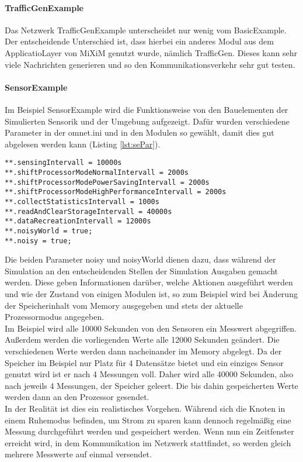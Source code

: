 \paragraph{TrafficGenExample}

Das Netzwerk TrafficGenExample unterscheidet nur wenig vom BasicExample. Der entscheidende Unterschied ist, dass hierbei ein anderes Modul aus dem ApplicatioLayer von MiXiM genutzt wurde, nämlich TrafficGen. Dieses kann sehr viele Nachrichten generieren und so den Kommunikationsverkehr sehr gut testen.

\paragraph{SensorExample}

Im Beispiel SensorExample wird die Funktionsweise von den Bauelementen der Simulierten Sensorik und der Umgebung aufgezeigt. Dafür wurden verschiedene Parameter in der omnet.ini und in den Modulen so gewählt, damit dies gut abgelesen werden kann (Listing \ref{lst:sePar}).\\

\begin{lstlisting}[language=ned,caption={Parameter für das Beispiel SensorExample},label=lst:sePar]
**.sensingIntervall = 10000s
**.shiftProcessorModeNormalIntervall = 2000s
**.shiftProcessorModePowerSavingIntervall = 2000s
**.shiftProcessorModeHighPerformanceIntervall = 2000s
**.collectStatisticsIntervall = 1000s
**.readAndClearStorageIntervall = 40000s
**.dataRecreationIntervall = 12000s
**.noisyWorld = true;
**.noisy = true; 
\end{lstlisting}

Die beiden Parameter noisy und noisyWorld dienen dazu, dass während der Simulation an den entscheidenden Stellen der Simulation Ausgaben gemacht werden. Diese geben Informationen darüber, welche Aktionen ausgeführt werden und wie der Zustand von einigen Modulen ist, so zum Beispiel wird bei Änderung der Speicherinhalt vom Memory ausgegeben und stets der aktuelle Prozessormodus angegeben.\\
Im Beispiel wird alle 10000 Sekunden von den Sensoren ein Messwert abgegriffen. Außerdem werden die vorliegenden Werte alle 12000 Sekunden geändert. Die verschiedenen Werte werden dann nacheinander im Memory abgelegt.
Da der Speicher im Beispiel nur Platz für 4 Datensätze bietet und ein einziges Sensor genutzt wird ist er nach 4 Messungen voll. Daher wird alle 40000 Sekunden, also nach jeweils 4 Messungen, der Speicher geleert. Die bis dahin gespeicherten Werte werden dann an den Prozessor gesendet.\\
In der Realität ist dies ein realistisches Vorgehen. Während sich die Knoten in einem Ruhemodus befinden, um Strom zu sparen kann dennoch regelmäßig eine Messung durchgeführt werden und gespeichert werden. Wenn nun ein Zeitfenster erreicht wird, in dem Kommunikation im Netzwerk stattfindet, so werden gleich mehrere Messwerte auf einmal versendet.

